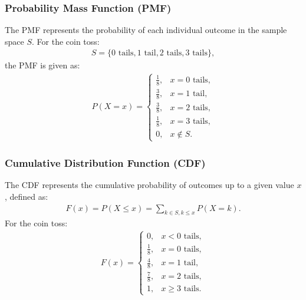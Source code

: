 \documentclass[journal]{IEEEtran}
\begin{document}
\subsubsection*{Probability Mass Function (PMF)}
The PMF represents the probability of each individual outcome in the sample space \( S \). For the coin toss:
\begin{align}
S = \{0 \text{ tails}, 1 \text{ tail}, 2 \text{ tails}, 3 \text{ tails}\},
\end{align}
the PMF is given as:
\begin{align}
P(X = x) = 
\begin{cases} 
\frac{1}{8}, & x = 0 \text{ tails}, \\
\frac{3}{8}, & x = 1 \text{ tail}, \\
\frac{3}{8}, & x = 2 \text{ tails}, \\
\frac{1}{8}, & x = 3 \text{ tails}, \\
0, & x \notin S.
\end{cases}
\end{align}

\subsubsection*{Cumulative Distribution Function (CDF)}
The CDF represents the cumulative probability of outcomes up to a given value \( x \), defined as:
\begin{align}
F(x) = P(X \leq x) = \sum_{k \in S, k \leq x} P(X = k).
\end{align}
For the coin toss:
\begin{align}
F(x) = 
\begin{cases} 
0, & x < 0 \text{ tails}, \\
\frac{1}{8}, & x = 0 \text{ tails}, \\
\frac{4}{8}, & x = 1 \text{ tail}, \\
\frac{7}{8}, & x = 2 \text{ tails}, \\
1, & x \geq 3 \text{ tails}.
\end{cases}
\end{align}
\end{document}
